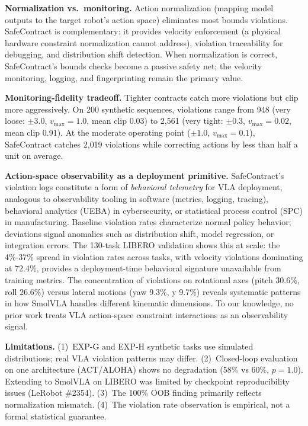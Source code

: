 \documentclass[conference]{IEEEtran}
\begin{document}
\textbf{Normalization vs.\ monitoring.}
Action normalization (mapping model outputs to the target robot's action space) eliminates most bounds violations.
SafeContract is complementary: it provides velocity enforcement (a physical hardware constraint normalization cannot address), violation traceability for debugging, and distribution shift detection.
When normalization is correct, SafeContract's bounds checks become a passive safety net; the velocity monitoring, logging, and fingerprinting remain the primary value.

\textbf{Monitoring-fidelity tradeoff.}
Tighter contracts catch more violations but clip more aggressively.
On 200 synthetic sequences, violations range from 948 (very loose: $\pm 3.0$, $v_{\max}{=}1.0$, mean clip 0.03) to 2{,}561 (very tight: $\pm 0.3$, $v_{\max}{=}0.02$, mean clip 0.91).
At the moderate operating point ($\pm 1.0$, $v_{\max}{=}0.1$), SafeContract catches 2{,}019 violations while correcting actions by less than half a unit on average.

\textbf{Action-space observability as a deployment primitive.}
SafeContract's violation logs constitute a form of \emph{behavioral telemetry} for VLA deployment, analogous to observability tooling in software (metrics, logging, tracing), behavioral analytics (UEBA) in cybersecurity, or statistical process control (SPC) in manufacturing.
Baseline violation rates characterize normal policy behavior; deviations signal anomalies such as distribution shift, model regression, or integration errors.
The 130-task LIBERO validation shows this at scale: the 4\%-37\% spread in violation rates across tasks, with velocity violations dominating at 72.4\%, provides a deployment-time behavioral signature unavailable from training metrics.
The concentration of violations on rotational axes (pitch 30.6\%, roll 26.6\%) versus lateral motions (yaw 9.3\%, y 9.7\%) reveals systematic patterns in how SmolVLA handles different kinematic dimensions.
To our knowledge, no prior work treats VLA action-space constraint interactions as an observability signal.

\textbf{Limitations.}
(1)~EXP-G and EXP-H synthetic tasks use simulated distributions; real VLA violation patterns may differ.
(2)~Closed-loop evaluation on one architecture (ACT/ALOHA) shows no degradation (58\% vs 60\%, $p{=}1.0$). Extending to SmolVLA on LIBERO was limited by checkpoint reproducibility issues (LeRobot \#2354).
(3)~The 100\% OOB finding primarily reflects normalization mismatch.
(4)~The violation rate observation is empirical, not a formal statistical guarantee.
\end{document}
